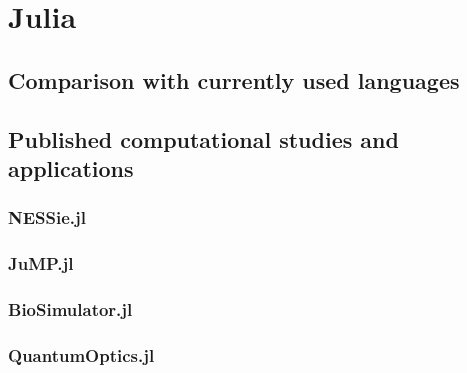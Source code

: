 
\section{Julia}

\subsection{Comparison with currently used languages}
\subsection{Published computational studies and applications}
\subsubsection{NESSie.jl}
\subsubsection{JuMP.jl}
\subsubsection{BioSimulator.jl}
\subsubsection{QuantumOptics.jl}
